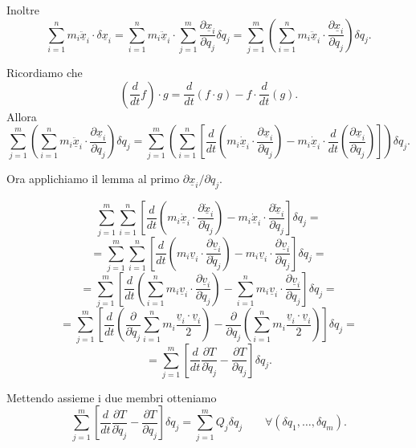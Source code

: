 Inoltre
\[
\sum_{i=1}^{n} m_i \ddot{\underline{x}}_i \cdot \delta \underline{x}_i
=
\sum_{i=1}^{n} m_i \ddot{\underline{x}}_i \cdot
\sum_{j=1}^{m}
\frac{\partial \underline{x}_i}{\partial q_j}\delta q_j
=
\sum_{j=1}^{m}
\left(
\sum_{i=1}^{n}
m_i \ddot{\underline{x}}_i \cdot
\frac{\partial \underline{x}_i}{\partial q_j}
\right)\delta q_j.
\]

Ricordiamo che
\[
\left(\frac{d}{dt}f\right)\cdot g
=
\frac{d}{dt}(f\cdot g)
-
f\cdot \frac{d}{dt}(g).
\]
Allora
\[
\sum_{j=1}^{m}
\left(
\sum_{i=1}^{n}
m_i \ddot{\underline{x}}_i \cdot
\frac{\partial \underline{x}_i}{\partial q_j}
\right)\delta q_j
=
\sum_{j=1}^{m}
\left(
\sum_{i=1}^{n}
\left[
\frac{d}{dt}
\left(
m_i \dot{\underline{x}}_i \cdot
\frac{\partial \underline{x}_i}{\partial q_j}
\right)
-
m_i \dot{\underline{x}}_i \cdot
\frac{d}{dt}
\left(
\frac{\partial \underline{x}_i}{\partial q_j}
\right)
\right]
\right)\delta q_j.
\]

Ora applichiamo il lemma al primo
$
{\partial \underline{x}_i}/{\partial q_j}.
$

\[
\sum_{j=1}^{m}\sum_{i=1}^{n}
\left[
\frac{d}{dt}
\left(
m_i \dot{\underline{x}}_i \cdot
\frac{\partial \underline{ \dot x}_i}{\partial \dot q_j}
\right)
-
m_i \dot{\underline{x}}_i \cdot
\frac{\partial \dot{\underline{x}}_i}{\partial q_j}
\right]\delta q_j
=
\]
\[
=
\sum_{j=1}^{m}\sum_{i=1}^{n}
\left[
\frac{d}{dt}
\left(
m_i \underline{v}_i \cdot
\frac{\partial \underline{v}_i}{\partial \dot{q}_j}
\right)
-
m_i \underline{v}_i \cdot
\frac{\partial \underline{v}_i}{\partial q_j}
\right]\delta q_j
=
\]
\[
=
\sum_{j=1}^{m}
\left[
\frac{d}{dt}
\left(
\sum_{i=1}^{n}
m_i \underline{v}_i \cdot
\frac{\partial \underline{v}_i}{\partial \dot{q}_j}
\right)
-
\sum_{i=1}^{n}
m_i \underline{v}_i \cdot
\frac{\partial \underline{v}_i}{\partial q_j}
\right]\delta q_j
=
\]
\[
=
\sum_{j=1}^{m}
\left[
\frac{d}{dt}
\left(
\frac{\partial}{\partial \dot{q}_j}
\sum_{i=1}^{n}
m_i \frac{\underline{v}_i \cdot \underline{v}_i}{2}
\right)
-
\frac{\partial}{\partial q_j}
\left(
\sum_{i=1}^{n}
m_i \frac{\underline{v}_i \cdot \underline{v}_i}{2}
\right)
\right]\delta q_j
=
\]
\[
=
\sum_{j=1}^{m}
\left[
\frac{d}{dt}
\frac{\partial T}{\partial \dot{q}_j}
-
\frac{\partial T}{\partial q_j}
\right]\delta q_j.
\]

Mettendo assieme i due membri otteniamo
\[
\sum_{j=1}^{m}
\left[
\frac{d}{dt}
\frac{\partial T}{\partial \dot{q}_j}
-
\frac{\partial T}{\partial q_j}
\right]\delta q_j
=
\sum_{j=1}^{m} Q_j \delta q_j
\qquad
\forall (\delta q_1,\ldots,\delta q_m).
\]

